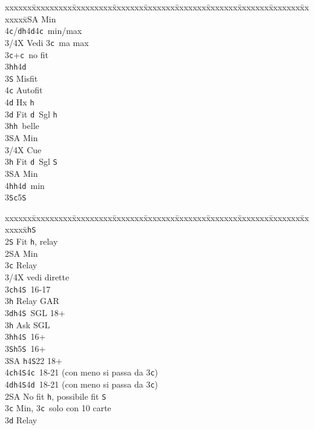 \documentclass[a4paper,italian]{article}
\newcommand{\BS}{\small{\texttt{S}}}
\newcommand{\BC}{\small{\texttt{c}}}
\newcommand{\BD}{\small{\texttt{d}}}
\newcommand{\BH}{\small{\texttt{h}}}
\newenvironment{bidtable}
{\begin{tabbing}

    xxxxxx\=xxxxxxxxx\=xxxxxxxxx\=xxxxxxx\=xxxxxxx\=xxxxxxx\=xxxxxxx\=xxxxxxx\=xxxxxxx\=xxxxxxx\=\kill}
{\end{tabbing} }%
\begin{document}
\begin{multicols}{2}
\begin{bidtable}
        3\small{SA} \> Min\\
        4\BC/\BD {}\BH 4\BD 4\BC\ min/max\-\-\\
        3/4X \> Vedi 3\BC\ ma max\-\\
        3\BC {}+\BC\ no fit\+\\
        3\BH {}\BH 4\BD \+\\
        3\BS \> Misfit\\
        4\BC \> Autofit\\
        4\BD \> Hx \BH \-\-\\
        3\BD \> Fit \BD\ Sgl \BH \+\\
        3\BH {}\BH\ belle\\
        3\small{SA} \> Min\\
        3/4X \> Cue\-\\
        3\BH \> Fit \BD\ Sgl \BS \+\\
        3\small{SA} \> Min\\
        4\BH {}\BH 4\BD\ min\-\\
        3\BS {}\BC 5\BS \-\\
    \end{bidtable}
    \columnbreak
    \begin{bidtable}
        2\BH {}\BS \+\\
        2\BS \> Fit \BH , relay\+\\
        2\small{SA} \> Min\+\\
        3\BC \> Relay\+\\
        3/4X \> vedi dirette\-\-\\
        3\BC {}\BH 4\BS\ 16-17\+\\
        3\BH \> Relay GAR\-\\
        3\BD {}\BH 4\BS\ SGL 18+\+\\
        3\BH \> Ask SGL\-\\
        3\BH {}\BH 4\BS\ 16+\\
        3\BS {}\BH 5\BS\ 16+\\
        3\small{SA} \BH 4\BS 22 18+\\
        4\BC {}\BH 4\BS 4\BC\ 18-21 (con meno si passa da 3\BC )\\
        4\BD {}\BH 4\BS 4\BD\ 18-21 (con meno si passa da 3\BC )\-\\
        2\small{SA} \> No fit \BH , possibile fit \BS\+\\
        3\BC \> Min, 3\BC\ solo con 10 carte\+\\
        3\BD \> Relay\+\\

\end{bidtable}
\end{multicols}
\end{document}
